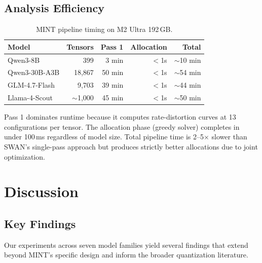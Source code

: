 \documentclass{article}
\begin{document}
\subsection{Analysis Efficiency}

\begin{table}[h]
\centering
\caption{MINT pipeline timing on M2 Ultra 192\,GB.}
\label{tab:timing}
\begin{tabular}{lrrrr}
\toprule
Model & Tensors & Pass 1 & Allocation & Total \\
\midrule
Qwen3-8B & 399 & 3 min & $<$1s & ${\sim}$10 min \\
Qwen3-30B-A3B & 18{,}867 & 50 min & $<$1s & ${\sim}$54 min \\
GLM-4.7-Flash & 9{,}703 & 39 min & $<$1s & ${\sim}$44 min \\
Llama-4-Scout & ${\sim}$1{,}000 & 45 min & $<$1s & ${\sim}$50 min \\
\bottomrule
\end{tabular}
\end{table}

Pass 1 dominates runtime because it computes rate-distortion curves at 13 configurations per tensor. The allocation phase (greedy solver) completes in under 100\,ms regardless of model size. Total pipeline time is 2--5$\times$ slower than SWAN's single-pass approach but produces strictly better allocations due to joint optimization.

\section{Discussion}
\label{sec:discussion}

\subsection{Key Findings}
\label{sec:key_findings}

Our experiments across seven model families yield several findings that extend beyond MINT's specific design and inform the broader quantization literature.
\end{document}

